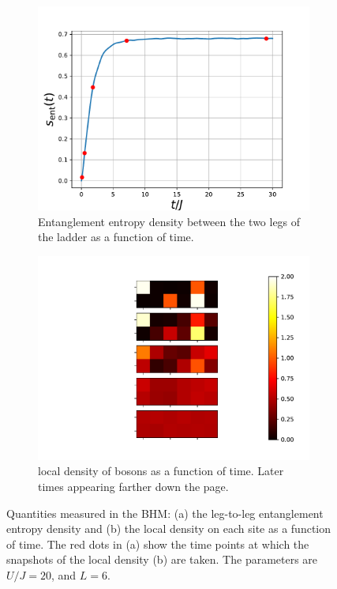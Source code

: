 \documentclass{SciPost}
\newcommand\0{\scalebox{-1}[1]{0}}
\begin{document}
\begin{figure}[t!]
	\centering
	\begin{subfigure}[a]{0.496\textwidth}
		\includegraphics[width=\textwidth]{boson_entropy.pdf}
		\caption{Entanglement entropy density between the two legs of the ladder as a function of time.}
	\end{subfigure}
	\begin{subfigure}[b]{0.496\textwidth}
		\includegraphics[width=\textwidth]{boson_density.pdf}
		\caption{local density of bosons as a function of time. Later times appearing farther down the page.}
	\end{subfigure}
	\caption{\label{fig:BHM} Quantities measured in the BHM: (a) the leg-to-leg entanglement entropy density and (b) the local density on each site as a function of time. The red dots in (a) show the time points at which the snapshots of the local density (b) are taken. The parameters are $U/J=20$, and $L=6$.}
\end{figure}
\end{document}
